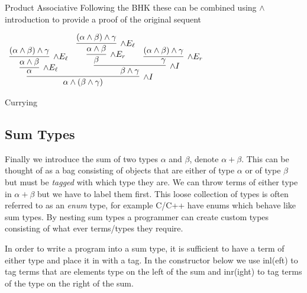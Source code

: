 \documentclass{book}
\begin{document}
\begin{eg}{Product Associative}
            Following the BHK these can be combined using $\land$ introduction to provide a proof of the original sequent 
                \begin{center}
                    $\begin{array}{c}
                        \infer[\land I]{\alpha \land (\beta \land \gamma)}
                            {\infer[\land E_{\ell}]{\alpha}
                                {\infer[\land E_{\ell}]{\alpha \land \beta}
                                {(\alpha \land \beta) \land \gamma}}
                                &
                                \infer[\land I]{\beta \land \gamma}
                                    {\infer[\land E_{r}]{\beta} 
                                        {\infer[\land E_{\ell}]{\alpha \land \beta}
                                            {(\alpha \land \beta) \land \gamma}}
                            &
                            \infer[\land E_{r}]{\gamma} 
                            {(\alpha \land \beta) \land \gamma}}}
                    \end{array}$
                \end{center}    
        \end{eg}

        \begin{eg}{Currying}


        \end{eg}


    \newpage
    \subsection*{Sum Types}

    Finally we introduce the sum of two types $\alpha$ and $\beta$, denote $\alpha + \beta$. This can be thought of as a bag consisting of objects that are either of type $\alpha$ or of type $\beta$ but must be \emph{tagged} with which type they are. We can throw terms of either type in $\alpha + \beta$ but we have to label them first. This loose collection of types is often referred to as an \emph{enum} type, for example C/C++ have enums which behave like sum types. By nesting sum types a programmer can create custom types consisting of what ever terms/types they require. 

    In order to write a program into a sum type, it is sufficient to have a term of either type and place it in with a tag. In the constructor below we use inl(eft) to tag terms that are elements type on the left of the sum and inr(ight) to tag terms of the type on the right of the sum. 
\end{document}
